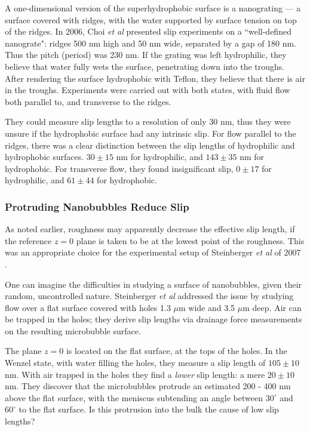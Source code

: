 \documentclass[12pt, a4paper, twoside, openright]{book}
\begin{document}
\vspace*{1em}

A one-dimensional version of the superhydrophobic surface is a nanograting --- a surface covered with ridges, with the water supported by surface tension on top of the ridges.  In 2006, Choi \emph{et al} \cite{Choi2006} presented slip experiments on a ``well-defined nanograte": ridges 500 nm high and 50 nm wide, separated by a gap of 180 nm.  Thus the pitch (period) was 230 nm.
If the grating was left hydrophilic, they believe that water fully wets the surface, penetrating down into the troughs.  After rendering the surface hydrophobic with Teflon, they believe that there is air in the troughs.  Experiments were carried out with both states, with fluid flow both parallel to, and transverse to the ridges.

They could measure slip lengths to a resolution of only 30 nm, thus they were unsure if the hydrophobic surface had any intrinsic slip.  For flow parallel to the ridges, there was a clear distinction between the slip lengths of hydrophilic and hydrophobic surfaces.  $30 \pm 15$ nm for hydrophilic, and $143 \pm 35$ nm for hydrophobic.  For transverse flow, they found insignificant slip, $0 \pm 17$ for hydrophilic, and $61 \pm 44$ for hydrophobic.



\subsubsection{Protruding Nanobubbles Reduce Slip}

As noted earlier, roughness may apparently decrease the effective slip length, if the reference $z=0$ plane is taken to be at the lowest point of the roughness.  This was an appropriate choice for the experimental setup of Steinberger \emph{et al} of 2007 \cite{Steinberger2007}.

One can imagine the difficulties in studying a surface of nanobubbles, given their random, uncontrolled nature.  Steinberger \emph{et al} addressed the issue by studying flow over a flat surface covered with holes 1.3 $\mu$m wide and 3.5 $\mu$m deep.  Air can be trapped in the holes; they derive slip lengths via drainage force measurements on the resulting microbubble surface.

The plane $z=0$ is located on the flat surface, at the tops of the holes.  In the Wenzel state, with water filling the holes, they measure a slip length of $105 \pm 10$ nm.  With air trapped in the holes they find a \emph{lower} slip length: a mere $20 \pm 10$ nm.
They discover that the microbubbles protrude an estimated 200 - 400 nm above the flat surface, with the meniscus subtending an angle between $30^{\circ}$ and $60^{\circ}$ to the flat surface.  Is this protrusion into the bulk the cause of low slip lengths?
\end{document}
